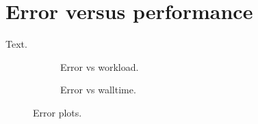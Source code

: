 \section{Error versus performance}
\label{sec:errorvsperformance}

Text.

\begin{figure}
\begin{subfigure}{1\textwidth}
  \centering
  
  \caption{Error vs workload.}
  \label{fig:errorworkload}
\end{subfigure}
\begin{subfigure}{1\textwidth}
  \centering
  
  \caption{Error vs walltime.}
  \label{fig:errorwalltime}
\end{subfigure}
\caption{Error plots.}
\label{fig:error}
\end{figure}